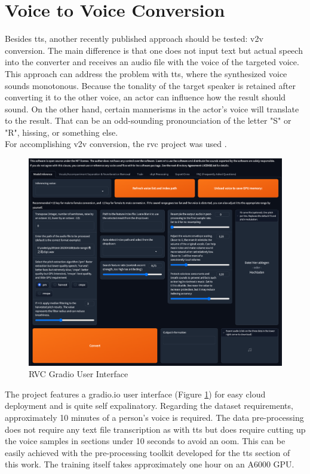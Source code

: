 \documentclass[
  a4paper,  %
  twoside,  %
  bibliography=totoc,
  headsepline,
  cleardoublepage=empty,
  parskip=half,
  draft=false
]{scrbook}
\begin{document}
\section{Voice to Voice Conversion}
\label{sec:v2v}
Besides \gls{tts}, another recently published approach should be tested: \gls{v2v} conversion. The main difference is that one does not input text but actual speech into the converter and receives an audio file with the voice of the targeted voice. This approach can address the problem with \gls{tts}, where the synthesized voice sounds monotonous. Because the tonality of the target speaker is retained after converting it to the other voice, an actor can influence how the result should sound. On the other hand, certain mannerisms in the actor's voice will translate to the result. That can be an odd-sounding pronounciation of the letter "S" or "R", hissing, or something else. \\
For accomplishing \gls{v2v} conversion, the \gls{rvc} project was used \cite{RVCProjectRetrievalbasedVoiceConversionWebUI2023}. 
\begin{figure}[h]
  \centering
  \includegraphics[width=1\textwidth]{./graphics/images/RVC-UI.png}
  \caption{RVC Gradio User Interface}
  \label{fig:rvc-gradio}
\end{figure}
The project features a gradio.io user interface (Figure \ref{fig:rvc-gradio}) for easy cloud deployment and is quite self expalinatory. Regarding the dataset requirements, approximately 10 minutes of a person's voice is required. The data pre-processing does not require any text file transcription as with \gls{tts} but does require cutting up the voice samples in sections under 10 seconds to avoid an \gls{oom}. This can be easily achieved with the pre-processing toolkit developed for the \gls{tts} section of this work. The training itself takes approximately one hour on an A6000 GPU. \\
\end{document}
